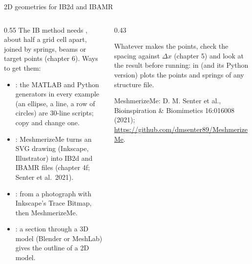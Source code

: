 \documentclass[aspectratio=169,11pt]{beamer}
\begin{document}
\begin{frame}{2D geometries for IB2d and IBAMR}
\begin{columns}[T,onlytextwidth]
\begin{column}{0.55\textwidth}
\small The IB method needs , about half a grid cell apart, joined by springs, beams or target points (chapter 6). Ways to get them:
\begin{itemize}
  \item {}: the MATLAB and Python generators in every example (an ellipse, a line, a row of circles) are 30-line scripts; copy and change one.
  \item {}: MeshmerizeMe turns an SVG drawing (Inkscape, Illustrator) into IB2d and IBAMR files (chapter 4f; Senter et al.\ 2021).
  \item {}: from a photograph with Inkscape's Trace Bitmap, then MeshmerizeMe.
  \item {}: a section through a 3D model (Blender or MeshLab) gives the outline of a 2D model.
\end{itemize}
\end{column}
\begin{column}{0.43\textwidth}
\begin{punchbox}
\small Whatever makes the points, check the spacing against $\Delta x$ (chapter 5) and look at the result before running:  in  (and its Python version) plots the points and springs of any structure file.
\end{punchbox}
\vspace{1mm}
{\scriptsize MeshmerizeMe: D. M. Senter et al., Bioinspiration \& Biomimetics 16:016008 (2021); \url{https://github.com/dmsenter89/MeshmerizeMe}.}
\end{column}
\end{columns}
\end{frame}
\end{document}
